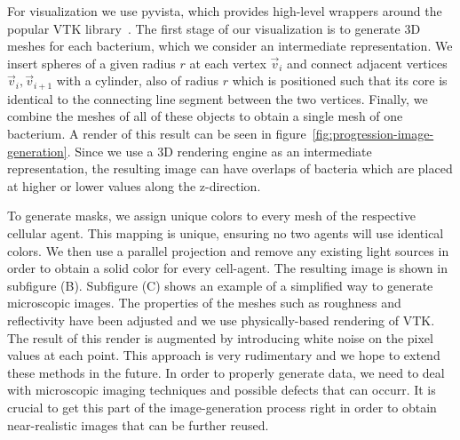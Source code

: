 \documentclass{article}
\begin{document}
For visualization we use pyvista, which provides high-level wrappers around the popular VTK
library~\cite{vtkBook,Sullivan2019}.
The first stage of our visualization is to generate 3D meshes for each bacterium, which we consider
an intermediate representation.
We insert spheres of a given radius $r$ at each vertex $\vec{v}_i$ and connect adjacent vertices
$\vec{v}_i,\vec{v}_{i+1}$ with a cylinder, also of radius $r$ which is positioned such that its core
is identical to the connecting line segment between the two vertices.
Finally, we combine the meshes of all of these objects to obtain a single mesh of one bacterium.
A render of this result can be seen in figure~\ref{fig:progression-image-generation}.
Since we use a 3D rendering engine as an intermediate representation, the resulting image can have
overlaps of bacteria which are placed at higher or lower values along the z-direction.

To generate masks, we assign unique colors to every mesh of the respective cellular agent.
This mapping is unique, ensuring no two agents will use identical colors.
We then use a parallel projection and remove any existing light sources in order to obtain a solid
color for every cell-agent.
The resulting image is shown in subfigure (B).
Subfigure (C) shows an example of a simplified way to generate microscopic images.
The properties of the meshes such as roughness and reflectivity have been adjusted and we use
physically-based rendering of VTK.
The result of this render is augmented by introducing white noise on the pixel values at each point.
This approach is very rudimentary and we hope to extend these methods in the future.
In order to properly generate data, we need to deal with microscopic imaging techniques and possible
defects that can occurr.
It is crucial to get this part of the image-generation process right in order to obtain
near-realistic images that can be further reused.
\end{document}
